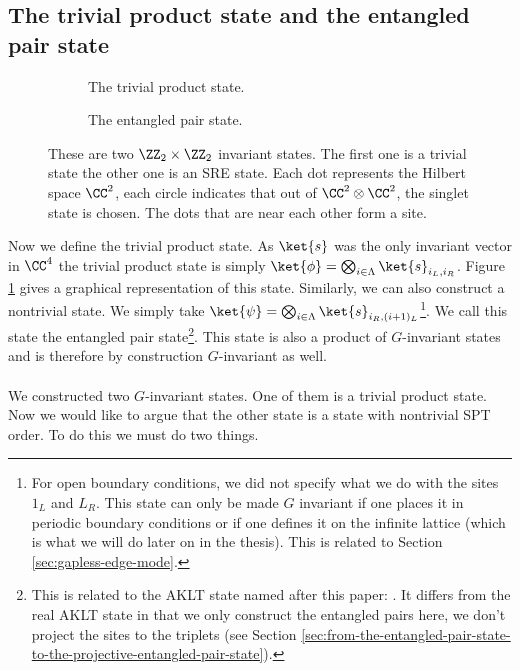 \subsection{The trivial product state and the entangled pair state}
\begin{figure}
	\centering
	\begin{subfigure}{\textwidth}
		\centering
		
		\caption{The trivial product state.}
		\label{fig:TrivialProductState}
	\end{subfigure}
	\begin{subfigure}{\textwidth}
		\centering
		
		\caption{The entangled pair state.}
		\label{fig:FakeAKLT_State}
	\end{subfigure}
	\caption{These are two $\ZZ_2\times\ZZ_2$ invariant states. The first one is a trivial state the other one is an SRE state. Each dot represents the Hilbert space $\CC^2$, each circle indicates that out of $\CC^2\otimes\CC^2$, the singlet state is chosen. The dots that are near each other form a site.}
	\label{fig:TheTwoHaldanePhases}
\end{figure}
Now we define the trivial product state. As $\ket{s}$ was the only invariant vector in $\CC^4$ the trivial product state is simply $\ket{\phi}=\bigotimes_{i\in\Lambda}\ket{s}_{i_L,i_R}$. Figure \ref{fig:TrivialProductState} gives a graphical representation of this state. Similarly, we can also construct a nontrivial state. We simply take $\ket{\psi}=\bigotimes_{i\in\Lambda}\ket{s}_{i_R,(i+1)_L}$\footnote{For open boundary conditions, we did not specify what we do with the sites $1_L$ and $L_R$. This state can only be made $G$ invariant if one places it in periodic boundary conditions or if one defines it on the infinite lattice (which is what we will do later on in the thesis). This is related to Section \ref{sec:gapless-edge-mode}.}. We call this state the entangled pair state\footnote{This is related to the AKLT state named after this paper: \cite{PhysRevLett.59.799}. It differs from the real AKLT state in that we only construct the entangled pairs here, we don't project the sites to the triplets (see Section \ref{sec:from-the-entangled-pair-state-to-the-projective-entangled-pair-state}).}. This state is also a product of $G$-invariant states and is therefore by construction $G$-invariant as well.\\\\
We constructed two $G$-invariant states. One of them is a trivial product state. Now we would like to argue that the other state is a state with nontrivial SPT order. To do this we must do two things.
